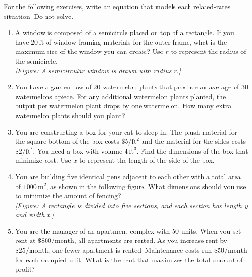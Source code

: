 \documentclass{exercises}
\begin{document}
For the following exercises, write an equation that models each related-rates situation. Do not solve.

\begin{enumerate}[resume]
\item A window is composed of a semicircle placed on top of a rectangle. If you have $20\,\text{ft}$ of window-framing materials for the outer frame, what is the maximum size of the window you can create? Use $r$ to represent the radius of the semicircle. \\ \textit{[Figure: A semicircular window is drawn with radius r.]}
\item You have a garden row of $20$ watermelon plants that produce an average of $30$ watermelons apiece. For any additional watermelon plants planted, the output per watermelon plant drops by one watermelon. How many extra watermelon plants should you plant?
\item You are constructing a box for your cat to sleep in. The plush material for the square bottom of the box costs $\$5/\text{ft}^{2}$ and the material for the sides costs $\$2/\text{ft}^{2}$. You need a box with volume $4{\,\text{ft}}^{3}$. Find the dimensions of the box that minimize cost. Use $x$ to represent the length of the side of the box.
\item You are building five identical pens adjacent to each other with a total area of $1000{\,\text{m}}^{2}$, as shown in the following figure. What dimensions should you use to minimize the amount of fencing? \\ \textit{[Figure: A rectangle is divided into five sections, and each section has length y and width x.]}
\item You are the manager of an apartment complex with $50$ units. When you set rent at $\$800/\text{month}$, all apartments are rented. As you increase rent by $\$25/\text{month}$, one fewer apartment is rented. Maintenance costs run $\$50/\text{month}$ for each occupied unit. What is the rent that maximizes the total amount of profit?
\end{enumerate}
\end{document}
